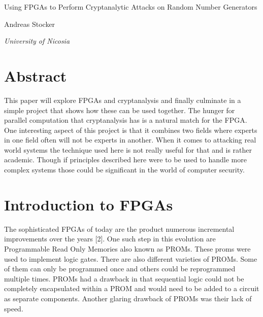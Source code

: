 \documentclass{article}
\begin{document}
    \begin{center}
    \end{center}
    
    \addvspace{20mm}
        
    \begin{center}
        \huge Using FPGAs to Perform Cryptanalytic Attacks on Random Number Generators
    \end{center}
    
    \begin{center}
    \end{center}
       
    \begin{center}
        \large Andreas Stocker
    \end{center}
    
    \begin{center}
        \small \emph {University of Nicosia}
    \end{center}

    \addvspace{15mm}

    \section*{Abstract}

    This paper will explore FPGAs and cryptanalysis and finally
    culminate in a simple project that shows how these can be used together.
    The hunger for parallel computation that cryptanalysis has is a
    natural match for the FPGA. One interesting aspect of this project is
    that it combines two fields where experts in one field often will not
    be experts in another. When it comes to attacking real world systems the technique
    used here is not really useful for that and is rather academic.
    Though if principles described here were to be used to handle more complex systems those
    could be significant in the world of computer security.

    \section{Introduction to FPGAs}

    The sophisticated FPGAs of today are the product numerous incremental improvements
    over the years [2]. One such step in this evolution are Programmable Read Only Memories
    also known as PROMs. These proms were used to implement logic gates. There are also
    different varieties of PROMs. Some of them can only be programmed once and
    others could be reprogrammed multiple times. PROMs had a drawback in that
    sequential logic could not be completely encapsulated within a PROM and would need
    to be added to a circuit as separate components. Another glaring drawback of PROMs was
    their lack of speed.
\end{document}
